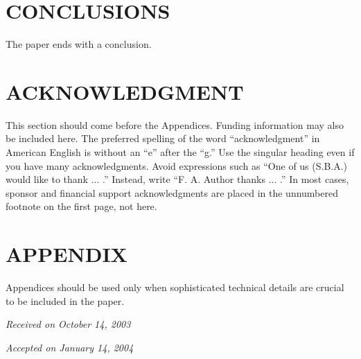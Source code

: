 \section{CONCLUSIONS}

The paper ends with a conclusion.




\section*{ACKNOWLEDGMENT}

This section should come before the Appendices. Funding information may also be included here. The preferred spelling of the word ``acknowledgment'' in American English is without an ``e'' after the ``g.'' Use the singular heading even if you have many acknowledgments. Avoid expressions such as ``One of us (S.B.A.) would like to thank ... .'' Instead, write ``F. A. Author thanks ... .'' In most cases, sponsor and financial support acknowledgments are placed in the unnumbered footnote on the first page, not here.

\section*{APPENDIX}

Appendices should be used only when sophisticated technical details are crucial to be included in the paper.

%
\hfill {\it Received on October 14, 2003}

\hfill {\it Accepted on January 14, 2004}

